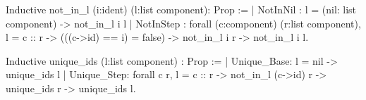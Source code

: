 Inductive not_in_l (i:ident) (l:list component): Prop :=
  | NotInNil  : l = (nil: list component) -> 
                not_in_l i l
  | NotInStep : forall (c:component) (r:list component),
                l = c :: r               ->      
                (((c->id) == i) = false) ->
                not_in_l i r             ->
                not_in_l i l. 
               
Inductive unique_ids (l:list component) : Prop :=
  | Unique_Base: l = nil -> unique_ids l
  | Unique_Step: forall c r,
                 l = c :: r         ->
                 not_in_l (c->id) r ->
                 unique_ids r       ->
                 unique_ids l.